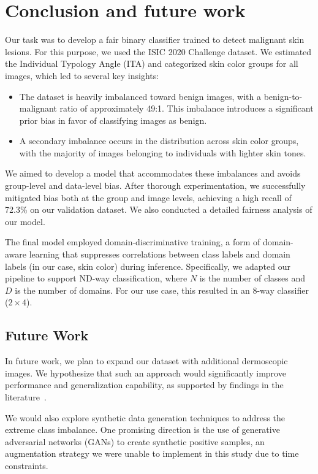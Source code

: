 \chapter{Conclusion and future work}
\label{ch:conclusion}

Our task was to develop a fair binary classifier trained to detect malignant skin lesions. For this purpose, we used the ISIC 2020 Challenge dataset. We estimated the Individual Typology Angle (ITA) and categorized skin color groups for all images, which led to several key insights:

\begin{itemize}
    \item The dataset is heavily imbalanced toward benign images, with a benign-to-malignant ratio of approximately 49:1. This imbalance introduces a significant prior bias in favor of classifying images as benign.
    \item A secondary imbalance occurs in the distribution across skin color groups, with the majority of images belonging to individuals with lighter skin tones.
\end{itemize}

We aimed to develop a model that accommodates these imbalances and avoids group-level and data-level bias. After thorough experimentation, we successfully mitigated bias both at the group and image levels, achieving a high recall of 72.3\% on our validation dataset. We also conducted a detailed fairness analysis of our model.

The final model employed domain-discriminative training, a form of domain-aware learning that suppresses correlations between class labels and domain labels (in our case, skin color) during inference. Specifically, we adapted our pipeline to support ND-way classification, where $N$ is the number of classes and $D$ is the number of domains. For our use case, this resulted in an 8-way classifier ($2 \times 4$).

\section{Future Work}

In future work, we plan to expand our dataset with additional dermoscopic images. We hypothesize that such an approach would significantly improve performance and generalization capability, as supported by findings in the literature~\cite{assessing_bias_in_classifiers}.

We would also explore synthetic data generation techniques to address the extreme class imbalance. One promising direction is the use of generative adversarial networks (GANs) to create synthetic positive samples, an augmentation strategy we were unable to implement in this study due to time constraints.

